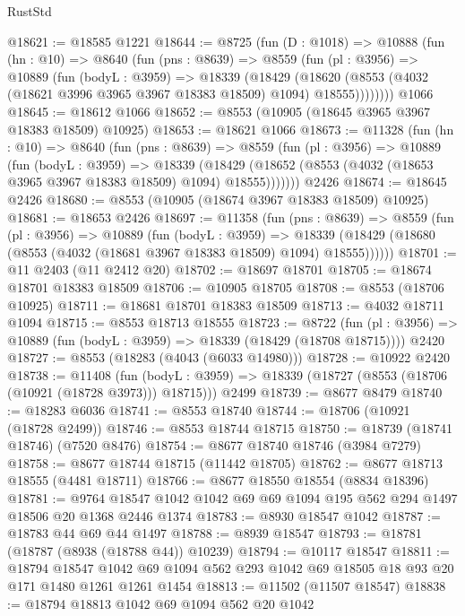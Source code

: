 \begin{lexlean}{RustStd}
\begin{coremodule}
@18621 := @18585 @1221
@18644 := @8725
    (fun (D : @1018) =>
    @10888
      (fun (hn : @10) =>
      @8640
        (fun (pns : @8639) =>
        @8559
          (fun (pl : @3956) =>
          @10889
            (fun (bodyL : @3959) =>
            @18339
              (@18429
                (@18620 (@8553 (@4032 (@18621 @3996 @3965 @3967 @18383 @18509) @1094) @18555))))))))
    @1066
@18645 := @18612 @1066
@18652 := @8553 (@10905 (@18645 @3965 @3967 @18383 @18509) @10925)
@18653 := @18621 @1066
@18673 := @11328
    (fun (hn : @10) =>
    @8640
      (fun (pns : @8639) =>
      @8559
        (fun (pl : @3956) =>
        @10889
          (fun (bodyL : @3959) =>
          @18339
            (@18429 (@18652 (@8553 (@4032 (@18653 @3965 @3967 @18383 @18509) @1094) @18555)))))))
    @2426
@18674 := @18645 @2426
@18680 := @8553 (@10905 (@18674 @3967 @18383 @18509) @10925)
@18681 := @18653 @2426
@18697 := @11358
    (fun (pns : @8639) =>
    @8559
      (fun (pl : @3956) =>
      @10889
        (fun (bodyL : @3959) =>
        @18339 (@18429 (@18680 (@8553 (@4032 (@18681 @3967 @18383 @18509) @1094) @18555))))))
@18701 := @11 @2403 (@11 @2412 @20)
@18702 := @18697 @18701
@18705 := @18674 @18701 @18383 @18509
@18706 := @10905 @18705
@18708 := @8553 (@18706 @10925)
@18711 := @18681 @18701 @18383 @18509
@18713 := @4032 @18711 @1094
@18715 := @8553 @18713 @18555
@18723 := @8722
    (fun (pl : @3956) => @10889 (fun (bodyL : @3959) => @18339 (@18429 (@18708 @18715))))
    @2420
@18727 := @8553 (@18283 (@4043 (@6033 @14980)))
@18728 := @10922 @2420
@18738 := @11408
    (fun (bodyL : @3959) => @18339 (@18727 (@8553 (@18706 (@10921 (@18728 @3973))) @18715)))
    @2499
@18739 := @8677 @8479
@18740 := @18283 @6036
@18741 := @8553 @18740
@18744 := @18706 (@10921 (@18728 @2499))
@18746 := @8553 @18744 @18715
@18750 := @18739 (@18741 @18746) (@7520 @8476)
@18754 := @8677 @18740 @18746 (@3984 @7279)
@18758 := @8677 @18744 @18715 (@11442 @18705)
@18762 := @8677 @18713 @18555 (@4481 @18711)
@18766 := @8677 @18550 @18554 (@8834 @18396)
@18781 := @9764 @18547 @1042 @1042 @69 @69 @1094 @195 @562 @294 @1497 @18506 @20 @1368 @2446 @1374
@18783 := @8930 @18547 @1042
@18787 := @18783 @44 @69 @44 @1497
@18788 := @8939 @18547
@18793 := @18781 (@18787 (@8938 (@18788 @44)) @10239)
@18794 := @10117 @18547
@18811 := @18794
    @18547
    @1042
    @69
    @1094
    @562
    @293
    @1042
    @69
    @18505
    @18
    @93
    @20
    @171
    @1480
    @1261
    @1261
    @1454
@18813 := @11502 (@11507 @18547)
@18838 := @18794
    @18813
    @1042
    @69
    @1094
    @562
    @20
    @1042

\end{coremodule}
\end{lexlean}
